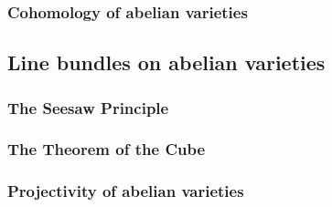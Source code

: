         \subsubsection{Cohomology of abelian varieties}
        
    \subsection{Line bundles on abelian varieties}
        \subsubsection{The Seesaw Principle}
        
        \subsubsection{The Theorem of the Cube}
        
        \subsubsection{Projectivity of abelian varieties}